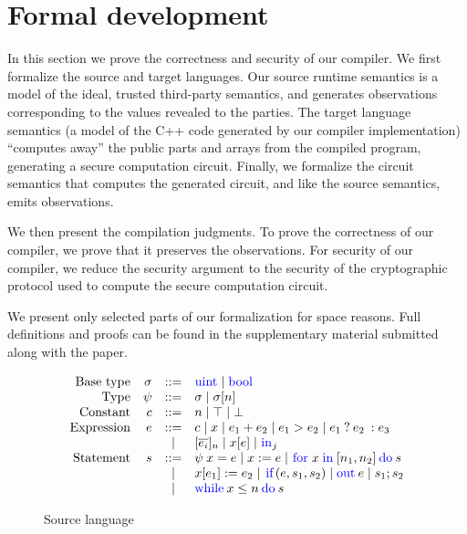 \newcommand{\kw}[1]{{\lstinline[basicstyle=\small\color{blue}]{#1}}}
\newcommand{\ftext}[1]{\text{\small{#1}}}
\newcommand{\cond}[3]{\ensuremath{{{#1}\:?\:{#2}\::{#3}}}}
\newcommand{\for}[4]{\ensuremath{\kw{for}\:{#1}\:\kw{in}\:[{#2}, {#3}]\:\kw{do}\:{#4}}}
\newcommand{\ite}[3]{\ensuremath{\kw{if}({#1}, {#2}, {#3})}}
\newcommand{\loops}[3]{\ensuremath{\kw{while}\:{#1} \leq {#2}\:\kw{do}\:{#3}}}

\section{Formal development}
\label{sec:ld}

In this section we prove the correctness and security of our compiler.
%
We first formalize the source and target languages. Our source runtime
semantics is a model of the ideal, trusted third-party semantics, and
generates observations corresponding to the values revealed to the
parties.
%
The target language semantics (a model of the C++ code generated by
our compiler implementation) ``computes away'' the public parts and
arrays from the compiled program, generating a secure computation
circuit.
%
Finally, we formalize the circuit semantics that computes the
generated circuit, and like the source semantics, emits observations.

We then present the compilation judgments. To prove the correctness
of our compiler, we prove that it preserves the observations. For
security of our compiler, we reduce the security argument to the
security of the cryptographic protocol used to compute the secure
computation circuit.

We present only selected parts of our formalization for space
reasons. Full definitions and proofs can be found in the supplementary
material submitted along with the paper.


\begin{figure}
  \small
  \[
  \begin{array}{rrcl}
    \ftext{Base type} & \sigma &::=& \kw{uint} \mid \kw{bool}\\
    \ftext{Type} & \psi &::=& \sigma \mid \sigma[n]\\
    \ftext{Constant} & c &::=& n \mid \top \mid \bot\\
    \ftext{Expression} & e &::=& c \mid x \mid e_{1} + e_{2} \mid e_{1} > e_{2} \mid \cond{e_{1}}{e_{2}}{e_{3}}\\
    & &\mid& [\overline{e_{i}}]_{n} \mid x[e] \mid \kw{in}_{j}\\
    \ftext{Statement} & s &::=& \psi\:x = e \mid x := e \mid \for{x}{n_{1}}{n_{2}}{s}\\
    & & \mid& x[e_{1}] := e_{2} \mid \ite{e}{s_{1}}{s_{2}} \mid \kw{out}\:e \mid s_{1}; s_{2}\\
    & & \mid& \loops{x}{n}{s}
  \end{array}
  \]
\caption{Source language}
\label{fig:srclang}
\end{figure}

